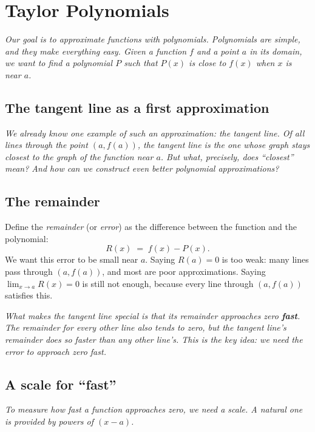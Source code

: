 \section{Taylor Polynomials}
\label{sec:14.3}

\textit{Our goal is to approximate functions with polynomials.  Polynomials are simple, and they make everything easy.  Given a function $f$ and a point $a$ in its domain, we want to find a polynomial $P$ such that $P(x)$ is close to $f(x)$ when $x$ is near $a$.}

\subsection*{The tangent line as a first approximation}

\textit{We already know one example of such an approximation: the tangent line.  Of all lines through the point $(a,f(a))$, the tangent line is the one whose graph stays closest to the graph of the function near $a$.  But what, precisely, does ``closest'' mean?  And how can we construct even better polynomial approximations?}

\subsection*{The remainder}

Define the \emph{remainder} (or \emph{error}) as the difference between the function and the polynomial:
\[
  R(x) \;=\; f(x)-P(x).
\]
We want this error to be small near $a$.  Saying $R(a)=0$ is too weak: many lines pass through $(a,f(a))$, and most are poor approximations.  Saying $\lim_{x\to a}R(x)=0$ is still not enough, because every line through $(a,f(a))$ satisfies this.

\textit{What makes the tangent line special is that its remainder approaches zero \textbf{fast}.  The remainder for every other line also tends to zero, but the tangent line's remainder does so faster than any other line's.  This is the key idea: we need the error to approach zero \emph{fast}.}

\subsection*{A scale for ``fast''}

\textit{To measure how fast a function approaches zero, we need a scale.  A natural one is provided by powers of $(x-a)$.}

